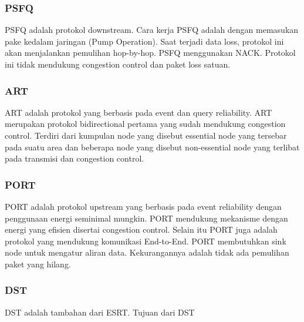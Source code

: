 \subsubsection{PSFQ}
PSFQ adalah protokol downstream. Cara kerja PSFQ adalah dengan memasukan pake kedalam jaringan (Pump Operation). Saat terjadi data loss, protokol ini akan menjalankan pemulihan hop-by-hop. PSFQ menggunakan NACK. Protokol ini tidak mendukung congestion control dan paket loss satuan.

\subsubsection{ART}
ART adalah protokol yang berbasis pada event dan query reliability. ART merupakan protokol bidirectional pertama yang sudah mendukung congestion control. Terdiri dari kumpulan node yang disebut essential node yang tersebar pada suatu area dan beberapa node yang disebut non-essential node yang terlibat pada transmisi dan congestion control.

\subsubsection{PORT}
PORT adalah protokol upstream yang berbasis pada event reliability dengan penggunaan energi seminimal mungkin. PORT mendukung mekanisme dengan energi yang efisien disertai congestion control. Selain itu PORT juga adalah protokol yang mendukung komunikasi End-to-End. PORT membutuhkan sink node untuk mengatur aliran data. Kekurangannya adalah tidak ada pemulihan paket yang hilang.

\subsubsection{DST}
DST adalah tambahan dari ESRT. Tujuan dari DST 

